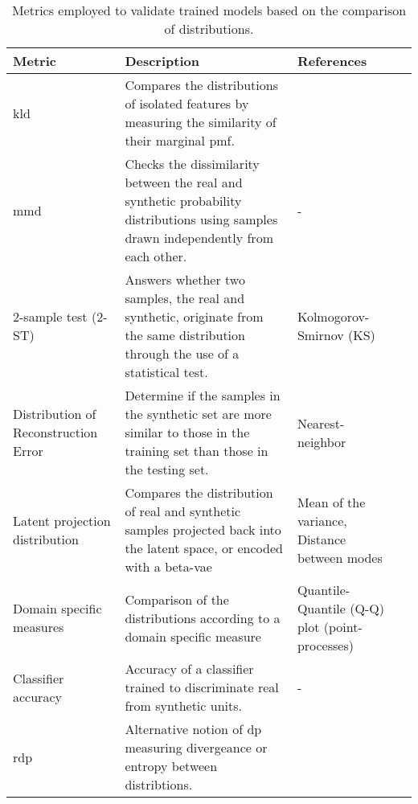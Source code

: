         \begin{table}[H]
        \footnotesize
            \caption{Metrics employed to validate trained models based on the comparison of distributions.\label{tab:distributions}} 
            \begin{tabularx}{\textwidth}{@{} p{} X  p{} @{}}\toprule
        
                Metric & Description & References\\\midrule
                
                \gls{kld} 
                & Compares the distributions of isolated features by measuring the similarity of their marginal \gls{pmf}. 
                & \cite{Goncalves2020}\\
                
                \gls{mmd} & 
                Checks the dissimilarity between the real and synthetic probability distributions using samples drawn independently from each other. & - &
                \cite{esteban2017real}\\
                
                2-sample test (2-ST) & Answers whether two samples, the real and synthetic, originate from the same distribution through the use of a statistical test. & 
                Kolmogorov-Smirnov (KS) & 
                \cite{Fisher2019,baowaly_2019_IEEE,baowaly_2019_jamia}\\
                
                Distribution of Reconstruction Error & 
                Determine if the samples in the synthetic set are more similar to those in the training set than those in the testing set. & Nearest-neighbor &
                \cite{esteban2017real}\\
                
                Latent projection distribution & 
                Compares the distribution of real and synthetic samples projected back into the latent space, or encoded with a \gls{beta-vae} & Mean of the variance, Distance between modes & \cite{Zhang2020} \\
                
                Domain specific measures & Comparison of the distributions according to a domain specific measure & Quantile-Quantile (Q-Q) plot (point-processes) & \cite{Xiao2017-lh}\\
                
                Classifier accuracy & Accuracy of a classifier trained to discriminate real from synthetic units. & - & \cite{Fisher2019,walsh2020generating}\\
                
                \gls{rdp} & Alternative notion of \gls{dp} measuring divergeance or entropy between distribtions. \cite{tanti2019}
                
                \bottomrule
        
            \end{tabularx}
        \end{table}


